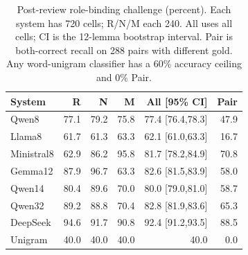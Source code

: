 \begin{table}[t]
\centering
\caption{Post-review role-binding challenge (percent). Each system has 720 cells; R/N/M each 240. All uses all cells; CI is the 12-lemma bootstrap interval. Pair is both-correct recall on 288 pairs with different gold. Any word-unigram classifier has a 60\% accuracy ceiling and 0\% Pair.}
\label{tab:binding}
\setlength{\tabcolsep}{2.5pt}
\begin{tabular}{lrrrrr}
\toprule
System & R & N & M & All [95\% CI] & Pair\\
\midrule
Qwen8 & 77.1 & 79.2 & 75.8 & 77.4 [76.4,78.3] & 47.9 \\
Llama8 & 61.7 & 61.3 & 63.3 & 62.1 [61.0,63.3] & 16.7 \\
Ministral8 & 62.9 & 86.2 & 95.8 & 81.7 [78.2,84.9] & 70.8 \\
Gemma12 & 87.9 & 96.7 & 63.3 & 82.6 [81.5,83.9] & 58.0 \\
Qwen14 & 80.4 & 89.6 & 70.0 & 80.0 [79.0,81.0] & 58.7 \\
Qwen32 & 89.2 & 88.8 & 70.4 & 82.8 [81.9,83.6] & 65.3 \\
DeepSeek & 94.6 & 91.7 & 90.8 & 92.4 [91.2,93.5] & 88.5 \\
Unigram & 40.0 & 40.0 & 40.0 & 40.0 & 0.0 \\
\bottomrule
\end{tabular}
\end{table}

